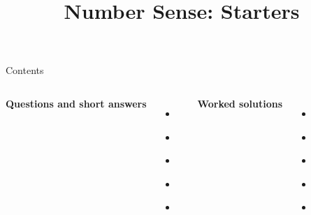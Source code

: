 \documentclass{beamer}
\title{Number Sense: Starters}
\author{}
\date{}
\newcommand{\qtight}{%
  \setlength{\itemsep}{0pt}\setlength{\parskip}{0pt}\setlength{\parsep}{0pt}%
  \setlength{\topsep}{0pt}\setlength{\partopsep}{0pt}%
}
\begin{document}
\frame{\titlepage}

\begin{frame}{Contents}
\small
\begin{columns}[T]
\textbf{Questions and short answers}
\begin{itemize}\qtight
  \item \hyperlink{q-st1}{}
  \item \hyperlink{q-st2}{}
  \item \hyperlink{q-st3}{}
  \item \hyperlink{q-st4}{}
  \item \hyperlink{q-st5}{}
\end{itemize}

\textbf{Worked solutions}
\begin{itemize}\qtight
  \item \hyperlink{work-st1}{}
  \item \hyperlink{work-st2}{}
  \item \hyperlink{work-st3}{}
  \item \hyperlink{work-st4}{}
  \item \hyperlink{work-st5}{}
\end{itemize}
\end{columns}
\end{frame}
\end{document}
